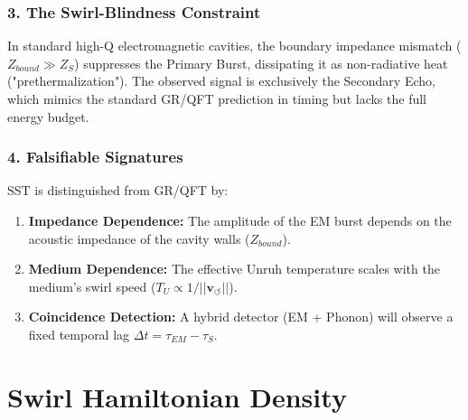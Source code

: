 \documentclass[10pt,reprint,aps,onecolumn,nofootinbib]{revtex4-2}
\begin{document}
\subsubsection*{\textbf{3. The Swirl-Blindness Constraint}}


In standard high-Q electromagnetic cavities, the boundary impedance mismatch ($Z_{bound} \gg Z_S$) suppresses the Primary Burst, dissipating it as non-radiative heat ("prethermalization"). The observed signal is exclusively the Secondary Echo, which mimics the standard GR/QFT prediction in timing but lacks the full energy budget.



\subsubsection*{\textbf{4. Falsifiable Signatures}}


SST is distinguished from GR/QFT by:

\begin{enumerate}
\item \textbf{Impedance Dependence:} The amplitude of the EM burst depends on the acoustic impedance of the cavity walls ($Z_{bound}$).


\item \textbf{Medium Dependence:} The effective Unruh temperature scales with the medium's swirl speed ($T_U \propto 1/||\mathbf{v}_{\circlearrowleft}||$).


\item \textbf{Coincidence Detection:} A hybrid detector (EM + Phonon) will observe a fixed temporal lag $\Delta t = \tau_{EM} - \tau_S$.


\end{enumerate}


    \section{Swirl Hamiltonian Density}
    \label{canon58:appA}
\end{document}
